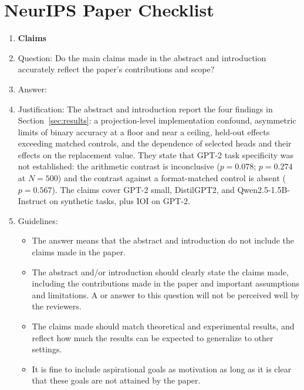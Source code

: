 \section*{NeurIPS Paper Checklist}

\begin{enumerate}

\item {\bf Claims}
    \item[] Question: Do the main claims made in the abstract and introduction accurately reflect the paper's contributions and scope?
    \item[] Answer: \answerYes{}
    \item[] Justification: The abstract and introduction report the four findings in Section~\ref{sec:results}: a projection-level implementation confound, asymmetric limits of binary accuracy at a floor and near a ceiling, held-out effects exceeding matched controls, and the dependence of selected heads and their effects on the replacement value. They state that GPT-2 task specificity was not established: the arithmetic contrast is inconclusive ($p=0.078$; $p=0.274$ at $N=500$) and the contrast against a format-matched control is absent ($p=0.567$). The claims cover GPT-2 small, DistilGPT2, and Qwen2.5-1.5B-Instruct on synthetic tasks, plus IOI on GPT-2.
    \item[] Guidelines:
    \begin{itemize}
        \item The answer \answerNA{} means that the abstract and introduction do not include the claims made in the paper.
        \item The abstract and/or introduction should clearly state the claims made, including the contributions made in the paper and important assumptions and limitations. A \answerNo{} or \answerNA{} answer to this question will not be perceived well by the reviewers. 
        \item The claims made should match theoretical and experimental results, and reflect how much the results can be expected to generalize to other settings. 
        \item It is fine to include aspirational goals as motivation as long as it is clear that these goals are not attained by the paper. 
    \end{itemize}


\end{enumerate}
